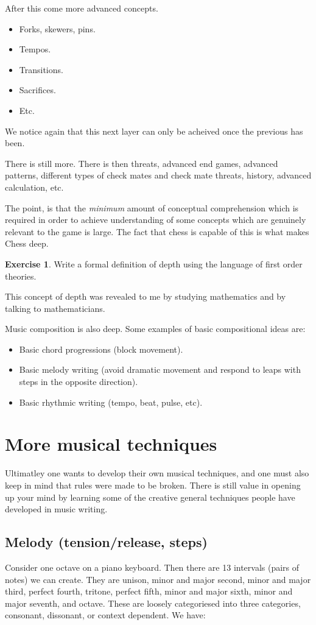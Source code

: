 \documentclass[12pt]{book}
\theoremstyle{plain}
\theoremstyle{definition}
\newtheorem{exercise}[thm]{Exercise}
\begin{document}
After this come more advanced concepts.
\begin{itemize}
	\item Forks, skewers, pins.
	\item Tempos.
	\item Transitions.
	\item Sacrifices.
	\item Etc.
\end{itemize}
We notice again that this next layer can only be acheived once the previous has been.

There is still more. There is then threats, advanced end games, advanced patterns, different types of check mates and check mate threats, history, advanced calculation, etc.

The point, is that the \emph{minimum} amount of conceptual comprehension which is required in order to achieve understanding of some concepts which are genuinely relevant to the game is large. The fact that chess is capable of this is what makes Chess deep.

\begin{exercise}
	Write a formal definition of depth using the language of first order theories.
\end{exercise}

This concept of depth was revealed to me by studying mathematics and by talking to mathematicians.

Music composition is also deep. Some examples of basic compositional ideas are:
\begin{itemize}
	\item Basic chord progressions (block movement).
	\item Basic melody writing (avoid dramatic movement and respond to leaps with steps in the opposite direction).
	\item Basic rhythmic writing (tempo, beat, pulse, etc).
\end{itemize}

\section{More musical techniques}
Ultimatley one wants to develop their own musical techniques, and one must also keep in mind that rules were made to be broken. There is still value in opening up your mind by learning some of the creative general techniques people have developed in music writing.

\subsection{Melody (tension/release, steps)}
Consider one octave on a piano keyboard. Then there are 13 intervals (pairs of notes) we can create. They are unison, minor and major second, minor and major third, perfect fourth, tritone, perfect fifth, minor and major sixth, minor and major seventh, and octave. These are loosely categoriesed into three categories, consonant, dissonant, or context dependent. We have:
\end{document}
